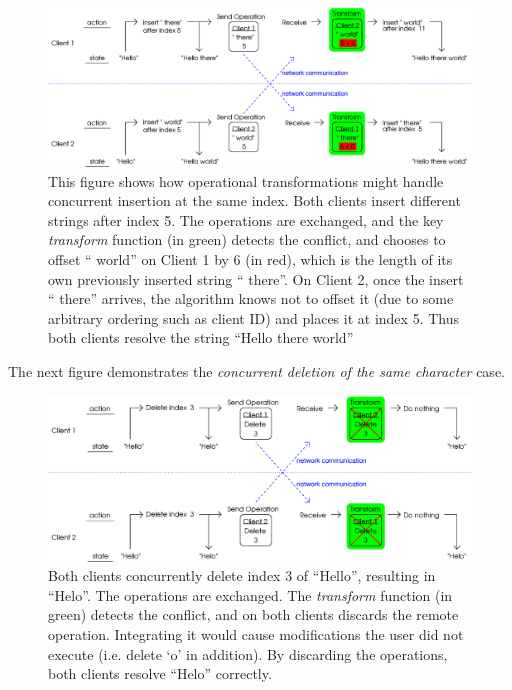 \documentclass[12pt,a4paper,twoside,openright]{report}
\begin{document}
	\begin{figure}[H]
	\centering
	\includegraphics[width=1\linewidth]{figs/ot1.eps}
	\caption[Operational Transformations --- concurrent insertion]{This figure shows how operational transformations might handle concurrent insertion at the same index. Both clients insert different strings after index 5. The operations are exchanged, and the key \textit{transform} function (in green) detects the conflict, and chooses to offset `` world'' on Client 1 by 6 (in red), which is the length of its own previously inserted string `` there''. On Client 2, once the insert `` there'' arrives, the algorithm knows not to offset it (due to some arbitrary ordering such as client ID) and places it at index 5. Thus both clients resolve the string ``Hello there world''}
	\label{fig:ot1}
	\end{figure}
	
	The next figure demonstrates the \textit{concurrent deletion of the same character} case.

	\begin{figure}[H]
	\centering
	\includegraphics[width=1\linewidth]{figs/ot2.eps}
	\caption[Operational Transformations --- concurrent deletion]{Both clients concurrently delete index 3 of ``Hello'', resulting in ``Helo''. The operations are exchanged. The \textit{transform} function (in green) detects the conflict, and on both clients discards the remote operation. Integrating it would cause modifications the user did not execute (i.e. delete `o' in addition). By discarding the operations, both clients resolve ``Helo'' correctly.}
	\label{fig:ot2}
	\end{figure}
	
\end{document}
